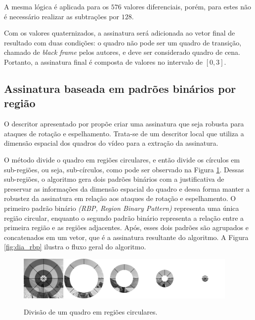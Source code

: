 A mesma lógica é aplicada para os $576$ valores diferenciais, porém, para estes não é necessário realizar as subtrações por $128$.

Com os valores quaternizados, a assinatura será adicionada ao vetor final de resultado com duas condições: o quadro não pode ser um quadro de transição, chamado de \textit{black frame} pelos autores, e deve ser considerado quadro de cena. Portanto, a assinatura final é composta de valores no intervalo de $\left[0,3\right]$.

%
\subsection{Assinatura baseada em padrões binários por região}


O descritor apresentado por  propõe criar uma assinatura que seja robusta para ataques de rotação e espelhamento. Trata-se de um descritor local que utiliza a dimensão espacial dos quadros do vídeo para a extração da assinatura. 


O método divide o quadro em regiões circulares, e então divide os círculos em sub-regiões, ou seja, sub-círculos, como pode ser observado na Figura \ref{fig:aneis_rbp}. Dessas sub-regiões, o algoritmo gera dois padrões binários com a justificativa de preservar as informações da dimensão espacial do quadro e dessa forma manter a robustez da assinatura em relação aos ataques de rotação e espelhamento. O  primeiro padrão binário  \textit{(RBP, Region Binary Pattern)} representa uma única região circular, enquanto o segundo padrão binário representa a relação entre a primeira região e as regiões adjacentes. Após, esses dois padrões são agrupados e concatenados em um vetor, que é a assinatura resultante do algoritmo. A Figura \ref{fig:dia_rbp} ilustra o fluxo geral do algoritmo.

 \begin{figure}[h]
      \centering
      \caption{Divisão de um quadro em regiões circulares.}
      \includegraphics[width=0.96\textwidth]{dados/figuras/brp_aneis}
       	\label{fig:aneis_rbp}
    \end{figure} 

